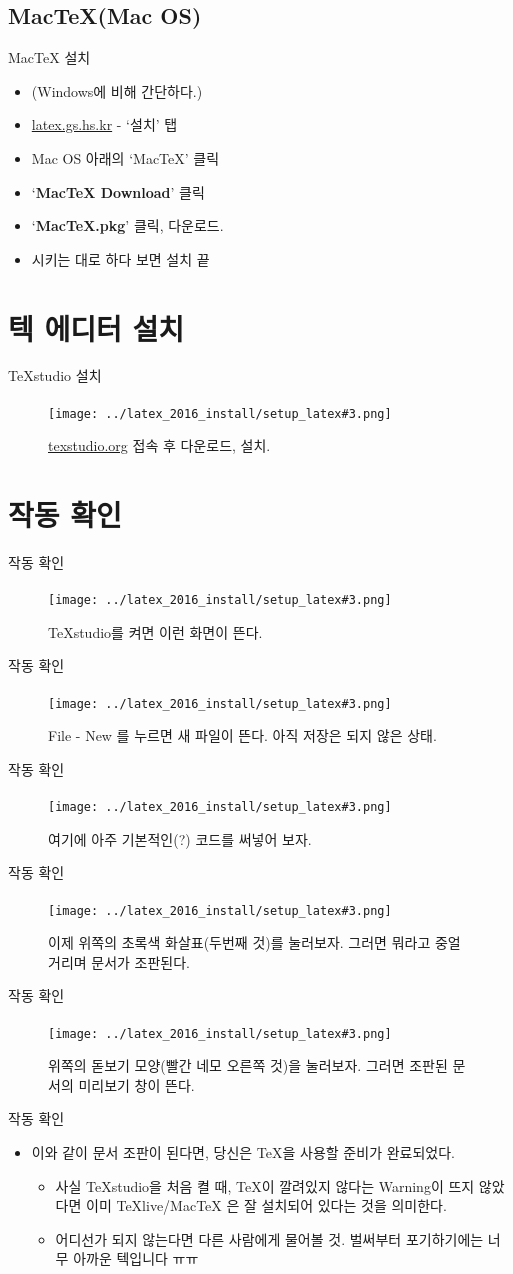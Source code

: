 \documentclass[12pt]{beamer}
\newcommand{\SetupImageSlideShow}[5]{
	\begin{frame}{#1}
		\framesubtitle{#2}
		\begin{figure}
			\centering
			\texttt{[image: ../latex\_2016\_install/setup\_latex\#3.png]}
			\caption{#4}
		\end{figure}
	\end{frame}
}
\begin{document}
\subsection{MacTeX(Mac OS)}
\begin{frame}{MacTeX 설치}
	\begin{itemize}
		\item (Windows에 비해 간단하다.)
		\item \url{latex.gs.hs.kr} - `설치' 탭
		\item Mac OS 아래의 `MacTeX' 클릭
		\item `\textbf{MacTeX Download}' 클릭
		\item `\textbf{MacTeX.pkg}' 클릭, 다운로드.
		\item 시키는 대로 하다 보면 설치 끝
	\end{itemize}
\end{frame}

\section{텍 에디터 설치}
\SetupImageSlideShow{TeXstudio 설치}{}{59}{\url{texstudio.org} 접속 후 다운로드, 설치.}{}

\section{작동 확인}

\SetupImageSlideShow{작동 확인}{}{60}{TeXstudio를 켜면 이런 화면이 뜬다.}{}
\SetupImageSlideShow{작동 확인}{}{61}{File - New 를 누르면 새 파일이 뜬다. 아직 저장은 되지 않은 상태.}{}
\SetupImageSlideShow{작동 확인}{}{62}{여기에 아주 기본적인(?) 코드를 써넣어 보자.}{}
\SetupImageSlideShow{작동 확인}{}{64}{이제 위쪽의 초록색 화살표(두번째 것)를 눌러보자. 그러면 뭐라고 중얼거리며 문서가 조판된다.}{}
\SetupImageSlideShow{작동 확인}{}{65}{위쪽의 돋보기 모양(빨간 네모 오른쪽 것)을 눌러보자. 그러면 조판된 문서의 미리보기 창이 뜬다.}{}

\begin{frame}{작동 확인}
	\begin{itemize}
		\item 이와 같이 문서 조판이 된다면, 당신은 \TeX 을 사용할 준비가 완료되었다.
		\begin{itemize}
			\item 사실 TeXstudio을 처음 켤 때, TeX이 깔려있지 않다는 Warning이 뜨지 않았다면 이미 TeXlive/MacTeX 은 잘 설치되어 있다는 것을 의미한다.
			\item 어디선가 되지 않는다면 다른 사람에게 물어볼 것. 벌써부터 포기하기에는 너무 아까운 텍입니다 ㅠㅠ
		\end{itemize}
	\end{itemize}
\end{frame}
\end{document}

